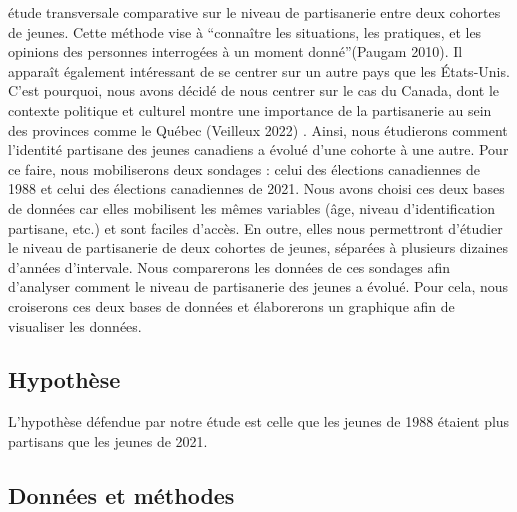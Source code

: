 \documentclass[
  letterpaper,
  DIV=11,
  numbers=noendperiod]{scrartcl}
\begin{document}
étude transversale comparative sur le niveau de partisanerie entre deux
cohortes de jeunes. Cette méthode vise à ``connaître les situations, les
pratiques, et les opinions des personnes interrogées à un moment
donné''(Paugam 2010). Il apparaît également intéressant de se centrer
sur un autre pays que les États-Unis. C'est pourquoi, nous avons décidé
de nous centrer sur le cas du Canada, dont le contexte politique et
culturel montre une importance de la partisanerie au sein des provinces
comme le Québec (Veilleux 2022) . Ainsi, nous étudierons comment
l'identité partisane des jeunes canadiens a évolué d'une cohorte à une
autre. Pour ce faire, nous mobiliserons deux sondages : celui des
élections canadiennes de 1988 et celui des élections canadiennes de
2021. Nous avons choisi ces deux bases de données car elles mobilisent
les mêmes variables (âge, niveau d'identification partisane, etc.) et
sont faciles d'accès. En outre, elles nous permettront d'étudier le
niveau de partisanerie de deux cohortes de jeunes, séparées à plusieurs
dizaines d'années d'intervale. Nous comparerons les données de ces
sondages afin d'analyser comment le niveau de partisanerie des jeunes a
évolué. Pour cela, nous croiserons ces deux bases de données et
élaborerons un graphique afin de visualiser les données.

\hypertarget{hypothuxe8se}{%
\subsection{Hypothèse}\label{hypothuxe8se}}

L'hypothèse défendue par notre étude est celle que les jeunes de 1988
étaient plus partisans que les jeunes de 2021.

\hypertarget{donnuxe9es-et-muxe9thodes}{%
\subsection{Données et méthodes}\label{donnuxe9es-et-muxe9thodes}}
\end{document}
